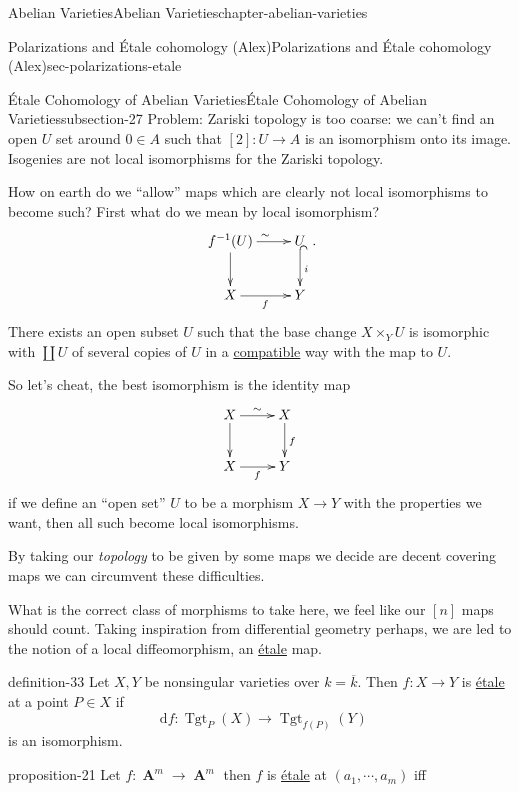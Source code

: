 \documentclass[oneside,10pt,]{book}
\numberwithin{equation}{section}
\newcommand{\diff}{\mathop{}\!\mathrm{d}}
\newcommand{\lb}{[}
\newcommand{\rb}{]}
\DeclareMathOperator{\Tgt}{Tgt}
\DeclareMathOperator{\aff}{\mathbf{A}}
\begin{document}
\begin{chapterptx}{Abelian Varieties}{}{Abelian Varieties}{}{}{chapter-abelian-varieties}
\begin{sectionptx}{Polarizations and Étale cohomology (Alex)}{}{Polarizations and Étale cohomology (Alex)}{}{}{sec-polarizations-etale}
\begin{subsectionptx}{Étale Cohomology of Abelian Varieties}{}{Étale Cohomology of Abelian Varieties}{}{}{subsection-27}
Problem: Zariski topology is too coarse: we can't find an open \(U\) set around \(0 \in A\) such that \(\lb 2\rb \colon U \to A\) is an isomorphism onto its image. Isogenies are not local isomorphisms for the Zariski topology.%
\par
\hypertarget{p-267}{}%
How on earth do we ``allow'' maps which are clearly not local isomorphisms to become such? First what do we mean by local isomorphism?%
\begin{equation*}
\xymatrix{
f^{-1}(U)\ar[d] \ar[r]^{\sim} & U\ar@{^(->}[d]^i\\
X \ar[r]_f & Y
}\text{.}
\end{equation*}
There exists an open subset \(U\) such that the base change \(X \times_Y U\) is isomorphic with \(\coprod U\) of several copies of \(U\) in a \hyperref[def-buntes-compat]{compatible} way with the map to \(U\).%
\par
\hypertarget{p-268}{}%
So let's cheat, the best isomorphism is the identity map%
\begin{equation*}
\xymatrix{
X\ar[d] \ar[r]^{\sim} & X\ar[d]^f\\
X \ar[r]_f & Y
}
\end{equation*}
if we define an ``open set'' \(U\) to be a morphism \(X \to Y\) with the properties we want, then all such become local isomorphisms.%
\par
\hypertarget{p-269}{}%
By taking our \emph{topology} to be given by some maps we decide are decent covering maps we can circumvent these difficulties.%
\par
\hypertarget{p-270}{}%
What is the correct class of morphisms to take here, we feel like our \(\lb n\rb\) maps should count. Taking inspiration from differential geometry perhaps, we are led to the notion of a local diffeomorphism, an \hyperref[def-etale]{étale} map.%
\begin{definition}{}{definition-33}%
\hypertarget{p-271}{}%
Let \(X,Y\) be nonsingular varieties over \(k = \overline k\). Then \(f\colon X\to Y\) is \hyperref[def-etale]{étale} at a point \(P\in X\) if%
\begin{equation*}
\diff f\colon\Tgt_{P}(X) \to \Tgt_{f(P)} (Y)
\end{equation*}
is an isomorphism.%
\end{definition}
\begin{proposition}{}{}{proposition-21}%
\hypertarget{p-272}{}%
Let \(f \colon \aff^m\to \aff^m\) then \(f\) is \hyperref[def-etale]{étale} at \((a_1, \cdots, a_m)\) iff%
\begin{equation*}

\end{equation*}
\end{proposition}
\end{subsectionptx}
\end{sectionptx}
\end{chapterptx}
\end{document}
